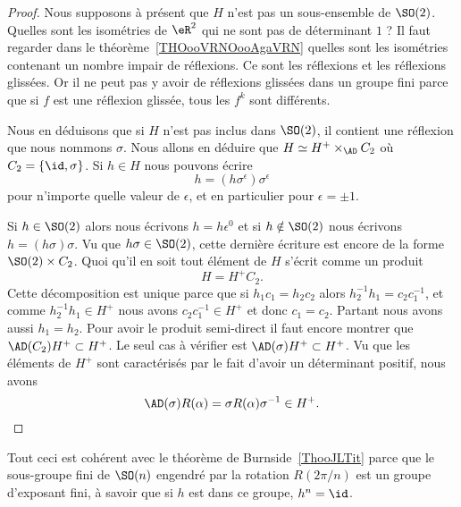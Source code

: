 \begin{proof}
        Nous supposons à présent que \( H\) n'est pas un sous-ensemble de \( \SO(2)\). Quelles sont les isométries de \( \eR^2\) qui ne sont pas de déterminant \( 1\) ? Il faut regarder dans le théorème~\ref{THOooVRNOooAgaVRN} quelles sont les isométries contenant un nombre impair de réflexions. Ce sont les réflexions et les réflexions glissées. Or il ne peut pas y avoir de réflexions glissées dans un groupe fini parce que si \( f\) est une réflexion glissée, tous les \( f^k\) sont différents.

        Nous en déduisons que si \( H\) n'est pas inclus dans \( \SO(2)\), il contient une réflexion que nous nommons \( \sigma\). Nous allons en déduire que \( H\simeq H^+\times_{\AD}C_2\) où \( C_2=\{ \id,\sigma \}\). Si \( h\in H\) nous pouvons écrire
        \begin{equation}
            h=(h\sigma^{\epsilon})\sigma^{\epsilon}
        \end{equation}
        pour n'importe quelle valeur de \( \epsilon\), et en particulier pour \( \epsilon=\pm 1\).

        Si \( h\in \SO(2)\) alors nous écrivons \( h=h\epsilon^{0}\) et si \( h\notin\SO(2)\) nous écrivons \( h=(h\sigma)\sigma\). Vu que \( h\sigma\in\SO(2)\), cette dernière écriture est encore de la forme \( \SO(2)\times C_2\). Quoi qu'il en soit tout élément de \( H\) s'écrit comme un produit
        \begin{equation}
            H=H^+C_2.
        \end{equation}
        Cette décomposition est unique parce que si \( h_1c_1=h_2c_2\) alors \( h_2^{-1}h_1=c_2c_1^{-1}\), et comme \( h_2^{-1}h_1\in H^+\) nous avons \( c_2c_1^{-1}\in H^+\) et donc \( c_1=c_2\). Partant nous avons aussi \( h_1=h_2\). Pour avoir le produit semi-direct il faut encore montrer que \( \AD(C_2)H^+\subset H^+\). Le seul cas à vérifier est \( \AD(\sigma)H^+\subset H^+\). Vu que les éléments de \( H^+\) sont caractérisés par le fait d'avoir un déterminant positif, nous avons
        \begin{equation}
            \AD(\sigma)R(\alpha)=\sigma R(\alpha)\sigma^{-1}\in H^+.
        \end{equation}
\end{proof}

\begin{remark}
    Tout ceci est cohérent avec le théorème de Burnside~\ref{ThooJLTit} parce que le sous-groupe fini de \( \SO(n)\) engendré par la rotation \( R(2\pi/n)\) est un groupe d'exposant fini, à savoir que si \( h\) est dans ce groupe, \( h^n=\id\).
\end{remark}
 
